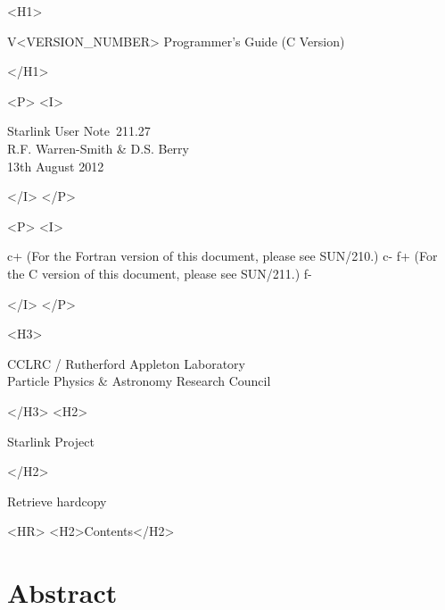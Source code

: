 \documentclass[twoside,11pt]{article}
\newcommand{\stardoccategory}  {Starlink User Note}
\newcommand{\stardocsource}    {sun\stardocnumber}
\newcommand{\stardocnumber}    {211.27}
\newcommand{\stardocnumber}    {210.27}
\newcommand{\stardocauthors}   {R.F. Warren-Smith \& D.S. Berry}
\newcommand{\stardocdate}      {13th August 2012}
\newcommand{\stardocversion}   {V<VERSION_NUMBER>}
\newcommand{\stardocmanualhtml}{Programmer's Guide (C Version)}
\newcommand{\stardocmanualhtml}{Programmer's Guide (Fortran Version)}
\newcommand{\htmladdnormallink}[2]{#1}
\newcommand{\htmladdimg}[1]{}
\newcommand{\htmlref}[2]{#1}
\newcommand{\htmladdtonavigation}[1]{}
\newcommand{\xref}[3]{#1}
\newcommand{\xlabel}[1]{}
\begin{document}
\begin{htmlonly}
   \begin{rawhtml} <H1> \end{rawhtml}
      \stardocversion
      \stardocmanualhtml
   \begin{rawhtml} </H1> \end{rawhtml}
   \begin{rawhtml} <P> <I> \end{rawhtml}
   \stardoccategory\ \stardocnumber \\
   \stardocauthors \\
   \stardocdate
   \begin{rawhtml} </I> </P> \end{rawhtml}
   \begin{rawhtml} <P> <I> \end{rawhtml}
c+
   (For the Fortran version of this document, please see
    \xref{SUN/210}{sun210}{}.)
c-
f+
   (For the C version of this document, please see \xref{SUN/211}{sun211}{}.)
f-
   \begin{rawhtml} </I> </P> \end{rawhtml}
   \begin{rawhtml} <H3> \end{rawhtml}
      \htmladdnormallink{CCLRC}{http://www.cclrc.ac.uk} /
      \htmladdnormallink{Rutherford Appleton Laboratory}
                        {http://www.cclrc.ac.uk/ral} \\
      \htmladdnormallink{Particle Physics \& Astronomy Research Council}
                        {http://www.pparc.ac.uk} \\
   \begin{rawhtml} </H3> <H2> \end{rawhtml}
      \htmladdnormallink{Starlink Project}{http://www.starlink.ac.uk/}
   \begin{rawhtml} </H2> \end{rawhtml}
   \htmladdnormallink{\htmladdimg{source.gif} Retrieve hardcopy}
      {http://www.starlink.ac.uk/cgi-bin/hcserver?\stardocsource}\\

  \label{stardoccontents}
  \begin{rawhtml}
    <HR>
    <H2>Contents</H2>
  \end{rawhtml}
  \htmladdtonavigation{\htmlref{\htmladdimg{contents_motif.gif}}
        {stardoccontents}}

  \section{\xlabel{abstract}Abstract}
\end{htmlonly}
\end{document}
